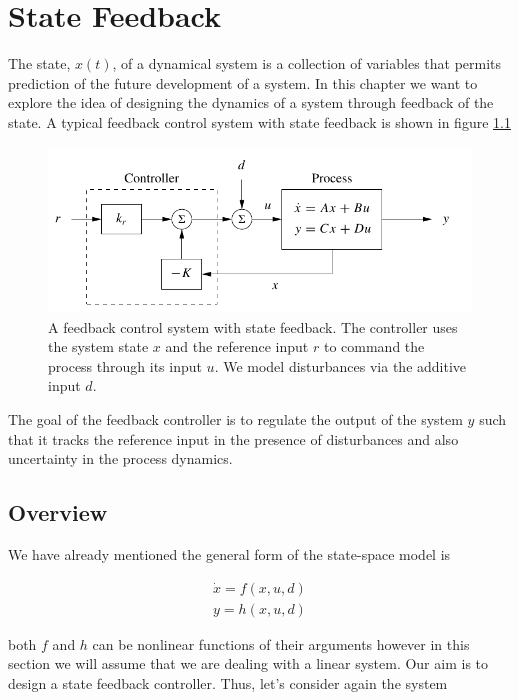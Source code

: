 \chapter{State Feedback}
\label{state_feedback}

The state, $x(t)$, of a dynamical system is a collection of variables that permits prediction
of the future development of a system. In this chapter we want to  explore the idea of designing
the dynamics of a system through feedback of the state.  A typical feedback control system with state feedback
is shown in figure \ref{state_feedback_sys}

\begin{figure}[!htb]
\begin{center}
\includegraphics[scale=0.280]{img/state_feedback/state_feedback_sys.jpeg}
\end{center}
\caption{A feedback control system with state feedback. The controller uses the system
state $x$ and the reference input $r$ to command the process through its input $u$. We model
disturbances via the additive input $d$.}
\label{state_feedback_sys}
\end{figure}


The goal of the feedback controller is to regulate the output of the system $y$ such that it tracks the reference input in the presence of disturbances and also uncertainty in the process dynamics.

\section{Overview}
We have already mentioned the general form of the state-space model is 

\begin{eqnarray}
\dot{x} = f(x, u, d) \\
y = h(x,u,d)
\end{eqnarray}

both $f$ and $h$ can be nonlinear functions of their arguments however in this section we will assume that we are dealing with a linear system. Our aim is
to design a state feedback controller. Thus, let's consider again the system

